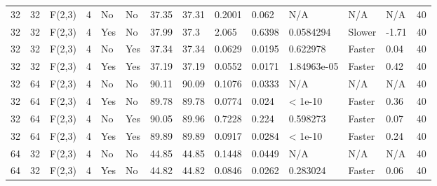 \begin{table}[t]
\begin{tabular}{llllllllllllll}
    32 &      32 &  F(2,3) &                  4 &    No &        No &             37.35 &               37.31 &     0.2001 &    0.062 &                    N/A &               N/A &                            N/A &    40 \\
    32 &      32 &  F(2,3) &                  4 &   Yes &        No &             37.99 &                37.3 &      2.065 &   0.6398 &              0.0584294 &            Slower &                          -1.71 &    40 \\
    32 &      32 &  F(2,3) &                  4 &    No &       Yes &             37.34 &               37.34 &     0.0629 &   0.0195 &               0.622978 &            Faster &                           0.04 &    40 \\
    32 &      32 &  F(2,3) &                  4 &   Yes &       Yes &             37.19 &               37.19 &     0.0552 &   0.0171 &            1.84963e-05 &            Faster &                           0.42 &    40 \\
    32 &      64 &  F(2,3) &                  4 &    No &        No &             90.11 &               90.09 &     0.1076 &   0.0333 &                    N/A &               N/A &                            N/A &    40 \\
    32 &      64 &  F(2,3) &                  4 &   Yes &        No &             89.78 &               89.78 &     0.0774 &    0.024 &                < 1e-10 &            Faster &                           0.36 &    40 \\
    32 &      64 &  F(2,3) &                  4 &    No &       Yes &             90.05 &               89.96 &     0.7228 &    0.224 &               0.598273 &            Faster &                           0.07 &    40 \\
    32 &      64 &  F(2,3) &                  4 &   Yes &       Yes &             89.89 &               89.89 &     0.0917 &   0.0284 &                < 1e-10 &            Faster &                           0.24 &    40 \\
    64 &      32 &  F(2,3) &                  4 &    No &        No &             44.85 &               44.85 &     0.1448 &   0.0449 &                    N/A &               N/A &                            N/A &    40 \\
    64 &      32 &  F(2,3) &                  4 &   Yes &        No &             44.82 &               44.82 &     0.0846 &   0.0262 &               0.283024 &            Faster &                           0.06 &    40 \\

\end{tabular}
\end{table}
